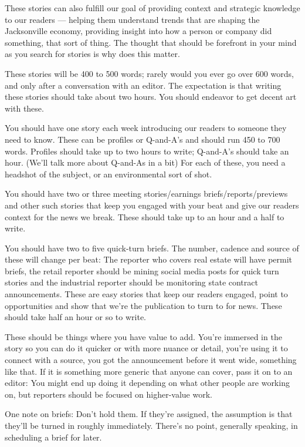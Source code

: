 \documentclass[
  11pt,
  american,
  letterpaperpaper,
  extrafontsizes,onecolumn,openright
  ]{memoir}
\begin{document}
These stories can also fulfill our goal of providing context and strategic knowledge to our readers --- helping them understand trends that are shaping the Jacksonville economy, providing insight into how a person or company did something, that sort of thing.
The thought that should be forefront in your mind as you search for stories is why does this matter.~

These stories will be 400 to 500 words; rarely would you ever go over 600 words, and only after a conversation with an editor. The expectation is that writing these stories should take about two hours. You should endeavor to get decent art with these.

You should have one story each week introducing our readers to someone they need to know. These can be profiles or Q-and-A's and should run 450 to 700 words. Profiles should take up to two hours to write; Q-and-A's should take an hour. (We'll talk more about Q-and-As in a bit) For each of these, you need a headshot of the subject, or an environmental sort of shot.

You should have two or three meeting stories/earnings briefs/reports/previews and other such stories that keep you engaged with your beat and give our readers context for the news we break. These should take up to an hour and a half to write.

You should have two to five quick-turn briefs. The number, cadence and source of these will change per beat: The reporter who covers real estate will have permit briefs, the retail reporter should be mining social media posts for quick turn stories and the industrial reporter should be monitoring state contract announcements. These are easy stories that keep our readers engaged, point to opportunities and show that we're the publication to turn to for news. These should take half an hour or so to write.

These should be things where you have value to add. You're immersed in the story so you can do it quicker or with more nuance or detail, you're using it to connect with a source, you got the announcement before it went wide, something like that. If it is something more generic that anyone can cover, pass it on to an editor: You might end up doing it depending on what other people are working on, but reporters should be focused on higher-value work.

One note on briefs: Don't hold them. If they're assigned, the assumption is that they'll be turned in roughly immediately. There's no point, generally speaking, in scheduling a brief for later.
\end{document}
